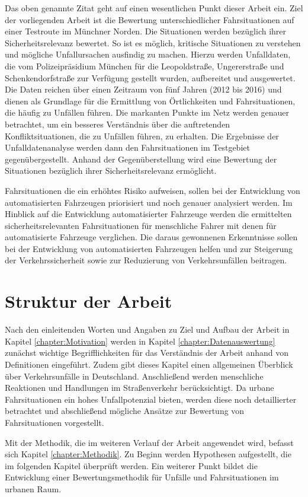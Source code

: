 Das oben genannte Zitat geht auf einen wesentlichen Punkt dieser Arbeit ein. Ziel der vorliegenden Arbeit ist die Bewertung unterschiedlicher Fahrsituationen auf einer Testroute im Münchner Norden. Die Situationen werden bezüglich ihrer Sicherheitsrelevanz bewertet. So ist es möglich, kritische Situationen zu verstehen und mögliche Unfallursachen ausfindig zu machen. Hierzu werden Unfalldaten, die vom Polizeipräsidium München für die Leopoldstraße, Ungererstraße und Schenkendorfstraße zur Verfügung gestellt wurden, aufbereitet und ausgewertet. Die Daten reichen über einen Zeitraum von fünf Jahren (2012 bis 2016) und dienen als Grundlage für die Ermittlung von Örtlichkeiten und Fahrsituationen, die häufig zu Unfällen führen. Die markanten Punkte im Netz werden genauer betrachtet, um ein besseres Verständnis über die auftretenden Konfliktsituationen, die zu Unfällen führen, zu erhalten. Die Ergebnisse der Unfalldatenanalyse werden dann den Fahrsituationen im Testgebiet gegenübergestellt. Anhand der Gegenüberstellung wird eine Bewertung der Situationen bezüglich ihrer Sicherheitsrelevanz ermöglicht.

Fahrsituationen die ein erhöhtes Risiko aufweisen, sollen bei der Entwicklung von automatisierten Fahrzeugen priorisiert und noch genauer analysiert werden. Im Hinblick auf die Entwicklung automatisierter Fahrzeuge werden die ermittelten sicherheitsrelevanten Fahrsituationen für menschliche Fahrer mit denen für automatisierte Fahrzeuge verglichen. Die daraus gewonnenen Erkenntnisse sollen bei der Entwicklung von automatisierten Fahrzeugen helfen und zur Steigerung der Verkehrssicherheit sowie zur Reduzierung von Verkehrsunfällen beitragen. 

\section{Struktur der Arbeit}
Nach den einleitenden Worten und Angaben zu Ziel und Aufbau der Arbeit in Kapitel \ref{chapter:Motivation} werden in Kapitel \ref{chapter:Datenauswertung} zunächst wichtige Begrifflichkeiten für das Verständnis der Arbeit anhand von Definitionen eingeführt. Zudem gibt dieses Kapitel einen allgemeinen Überblick über Verkehrsunfälle in Deutschland. Anschließend werden menschliche Reaktionen und Handlungen im Straßenverkehr berücksichtigt. Da urbane Fahrsituationen ein hohes Unfallpotenzial bieten, werden diese noch detaillierter betrachtet und abschließend mögliche Ansätze zur Bewertung von Fahrsituationen vorgestellt.

Mit der Methodik, die im weiteren Verlauf der Arbeit angewendet wird, befasst sich Kapitel \ref{chapter:Methodik}. Zu Beginn werden Hypothesen aufgestellt, die im folgenden Kapitel überprüft werden. Ein weiterer Punkt bildet die Entwicklung einer Bewertungsmethodik für Unfälle und Fahrsituationen im urbanen Raum.

